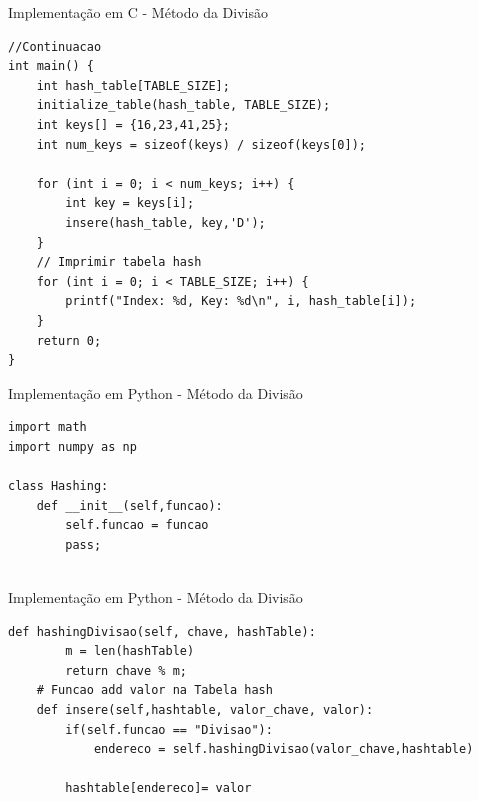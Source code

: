 \documentclass{beamer}
\begin{document}
\begin{frame}[fragile]{Implementação em C - Método da Divisão}
\footnotesize
\begin{lstlisting}[style=CStyle]
//Continuacao
int main() {
    int hash_table[TABLE_SIZE];
    initialize_table(hash_table, TABLE_SIZE);
    int keys[] = {16,23,41,25};
    int num_keys = sizeof(keys) / sizeof(keys[0]);

    for (int i = 0; i < num_keys; i++) {
        int key = keys[i];
        insere(hash_table, key,'D');
    }
    // Imprimir tabela hash
    for (int i = 0; i < TABLE_SIZE; i++) {
        printf("Index: %d, Key: %d\n", i, hash_table[i]);
    }
    return 0;
}
\end{lstlisting}
\end{frame}


\begin{frame}[fragile]{Implementação em Python - Método da Divisão}
 
\centering\footnotesize
\begin{lstlisting}[style=PythonStyle]
import math
import numpy as np

class Hashing:
    def __init__(self,funcao):
        self.funcao = funcao
        pass;
    
\end{lstlisting}


\end{frame} 

\begin{frame}[fragile]{Implementação em Python - Método da Divisão}
\centering\footnotesize
\begin{lstlisting}[style=PythonStyle]
    def hashingDivisao(self, chave, hashTable):
        m = len(hashTable)
        return chave % m;
    # Funcao add valor na Tabela hash
    def insere(self,hashtable, valor_chave, valor):
        if(self.funcao == "Divisao"):
            endereco = self.hashingDivisao(valor_chave,hashtable)
        
        hashtable[endereco]= valor
    
\end{lstlisting}


\end{frame} 
\end{document}
